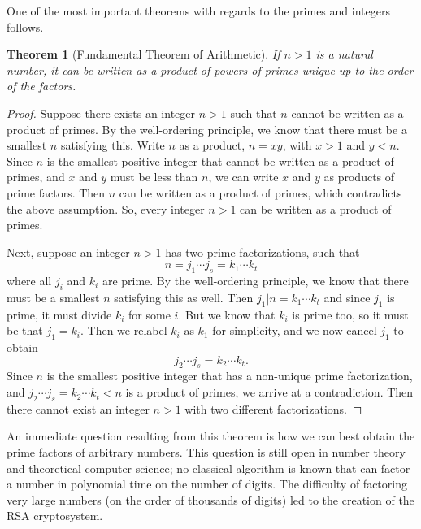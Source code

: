 \documentclass{amsart}
\newtheorem{thm}{Theorem}
\theoremstyle{definition}
\theoremstyle{case}
\begin{document}
	One of the most important theorems with regards to the primes and integers follows.
	\begin{thm}[Fundamental Theorem of Arithmetic]\label{arith}
		If $n > 1$ is a natural number, it can be written as a product of powers of primes unique up to the order of the factors.
	\end{thm}
	\begin{proof}
		Suppose there exists an integer $n>1$ such that $n$ cannot be written as a product of primes. By the well-ordering principle, we know that there must be a smallest $n$ satisfying this. Write $n$ as a product, $n = xy$, with $x>1$ and $y<n$. Since $n$ is the smallest positive integer that cannot be written as a product of primes, and $x$ and $y$ must be less than $n$, we can write $x$ and $y$ as products of prime factors. Then $n$ can be written as a product of primes, which contradicts the above assumption. So, every integer $n>1$ can be written as a product of primes.
		
		Next, suppose an integer $n>1$ has two prime factorizations, such that
		$$ n = j_1 \cdots j_s = k_1 \cdots k_t $$
		where all $j_i$ and $k_i$ are prime. By the well-ordering principle, we know that there must be a smallest $n$ satisfying this as well. Then $j_1 | n = k_1 \cdots k_t$ and since $j_1$ is prime, it must divide $k_i$ for some $i$. But we know that $k_i$ is prime too, so it must be that $j_1 = k_i$. Then we relabel $k_i$ as $k_1$ for simplicity, and we now cancel $j_1$ to obtain
		$$ j_2 \cdots j_s = k_2 \cdots k_t . $$
		Since $n$ is the smallest positive integer that has a non-unique prime factorization, and $ j_2 \cdots j_s = k_2 \cdots k_t < n $ is a product of primes, we arrive at a contradiction. Then there cannot exist an integer $n>1$ with two different factorizations.
	\end{proof}

	An immediate question resulting from this theorem is how we can best obtain the prime factors of arbitrary numbers. This question is still open in number theory and theoretical computer science; no classical algorithm is known that can factor a number in polynomial time on the number of digits. The difficulty of factoring very large numbers (on the order of thousands of digits) led to the creation of the RSA cryptosystem.
	
\end{document}

